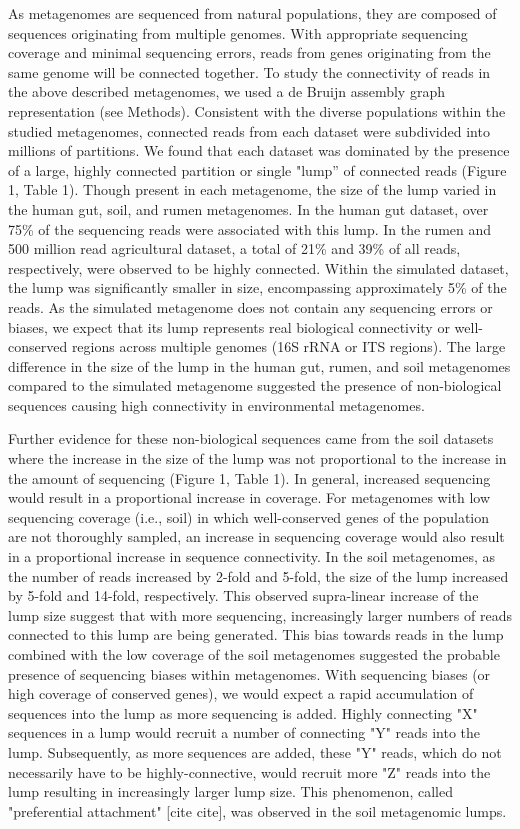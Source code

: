 \documentclass[11pt]{article} %
\begin{document}
As metagenomes are sequenced from natural populations, they are composed of sequences originating from multiple genomes.  With appropriate sequencing coverage and minimal sequencing errors, reads from genes originating from the same genome will be connected together.  To study the connectivity of reads in the above described metagenomes, we used a de Bruijn assembly graph representation (see Methods).  Consistent with the diverse populations within the studied metagenomes, connected reads from each dataset were subdivided into millions of partitions.  We found that each dataset was dominated by the presence of a large, highly connected partition or single "lump'' of connected reads (Figure 1, Table 1).   Though present in each metagenome, the size of the lump varied in the human gut, soil, and rumen metagenomes.  In the human gut dataset, over 75\% of the sequencing reads were associated with this lump.  In the rumen and 500 million read agricultural dataset, a total of 21\% and 39\% of all reads, respectively, were observed to be highly connected. Within the simulated dataset, the lump was significantly smaller in size, encompassing approximately 5\% of the reads.  As the simulated metagenome does not contain any sequencing errors or biases, we expect that its lump represents real biological connectivity or well-conserved regions across multiple genomes (16S rRNA or ITS regions).  The large difference in the size of the lump in the human gut, rumen, and soil metagenomes compared to the simulated metagenome suggested the presence of non-biological sequences causing high connectivity in environmental metagenomes.

Further evidence for these non-biological sequences came from the soil datasets where the increase in the size of the lump was not proportional to the increase in the amount of sequencing (Figure 1, Table 1).  In general, increased sequencing would result in a proportional increase in coverage.  For metagenomes with low sequencing coverage (i.e., soil) in which well-conserved genes of the population are not thoroughly sampled, an increase in sequencing coverage would also result in a proportional increase in sequence connectivity.  In the soil metagenomes, as the number of reads increased by 2-fold and 5-fold, the size of the lump increased by 5-fold and 14-fold, respectively. This observed supra-linear increase of the lump size suggest that with more sequencing, increasingly larger numbers of reads connected to this lump are being generated.  This bias towards reads in the lump combined with the low coverage of the soil metagenomes suggested the probable presence of sequencing biases within metagenomes.  With sequencing biases (or high coverage of conserved genes), we would expect a rapid accumulation of sequences into the lump as more sequencing is added. Highly connecting "X" sequences in a lump would recruit a number of connecting "Y" reads into the lump.  Subsequently, as more sequences are added, these "Y" reads, which do not necessarily have to be highly-connective, would recruit more "Z" reads into the lump resulting in increasingly larger lump size.  This phenomenon, called "preferential attachment" [cite cite], was observed in the soil metagenomic lumps.
\end{document}
